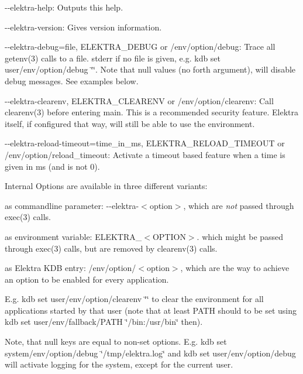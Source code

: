 \begin{DoxyItemize}
\item {\ttfamily -\/-\/elektra-\/help}\+: Outputs this help.
\item {\ttfamily -\/-\/elektra-\/version}\+: Gives version information.
\item {\ttfamily -\/-\/elektra-\/debug=file}, {\ttfamily E\+L\+E\+K\+T\+R\+A\+\_\+\+D\+E\+B\+U\+G} or {\ttfamily /env/option/debug}\+: Trace all getenv(3) calls to a file. stderr if no file is given, e.\+g. {\ttfamily kdb set user/env/option/debug \char`\"{}\char`\"{}}. Note that null values (no forth argument), will disable debug messages. See examples below.
\item {\ttfamily -\/-\/elektra-\/clearenv}, {\ttfamily E\+L\+E\+K\+T\+R\+A\+\_\+\+C\+L\+E\+A\+R\+E\+N\+V} or {\ttfamily /env/option/clearenv}\+: Call clearenv(3) before entering main. This is a recommended security feature. Elektra itself, if configured that way, will still be able to use the environment.
\item {\ttfamily -\/-\/elektra-\/reload-\/timeout=time\+\_\+in\+\_\+ms}, {\ttfamily E\+L\+E\+K\+T\+R\+A\+\_\+\+R\+E\+L\+O\+A\+D\+\_\+\+T\+I\+M\+E\+O\+U\+T} or {\ttfamily /env/option/reload\+\_\+timeout}\+: Activate a timeout based feature when a time is given in ms (and is not 0).
\end{DoxyItemize}

Internal Options are available in three different variants\+:


\begin{DoxyEnumerate}
\item as commandline parameter\+: {\ttfamily -\/-\/elektra-\/$<$option$>$}, which are {\itshape not} passed through exec(3) calls.
\end{DoxyEnumerate}
\begin{DoxyEnumerate}
\item as environment variable\+: {\ttfamily E\+L\+E\+K\+T\+R\+A\+\_\+$<$O\+P\+T\+I\+O\+N$>$}. which might be passed through exec(3) calls, but are removed by clearenv(3) calls.
\end{DoxyEnumerate}
\begin{DoxyEnumerate}
\item as Elektra K\+D\+B entry\+: {\ttfamily /env/option/$<$option$>$}, which are the way to achieve an option to be enabled for every application.

E.\+g. {\ttfamily kdb set user/env/option/clearenv \char`\"{}\char`\"{}} to clear the environment for all applications started by that user (note that at least {\ttfamily P\+A\+T\+H} should to be set using {\ttfamily kdb set user/env/fallback/\+P\+A\+T\+H \char`\"{}/bin\+:/usr/bin\char`\"{}} then).

Note, that null keys are equal to non-\/set options. E.\+g. {\ttfamily kdb set system/env/option/debug \char`\"{}/tmp/elektra.\+log\char`\"{}} and {\ttfamily kdb set user/env/option/debug} will activate logging for the system, except for the current user.
\end{DoxyEnumerate}

